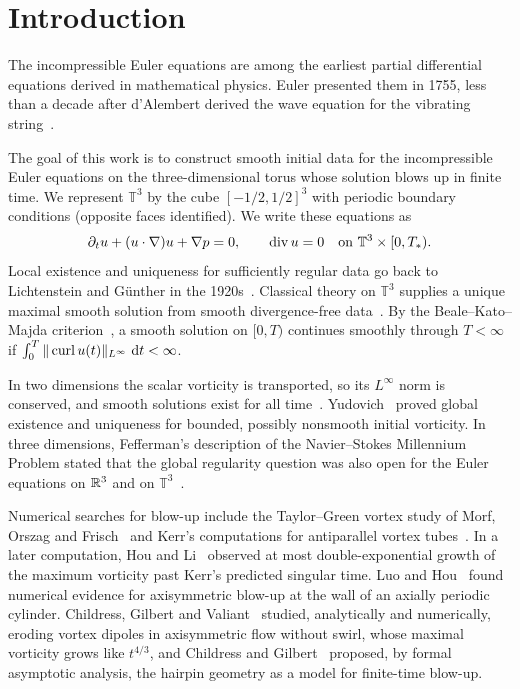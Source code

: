 \section{Introduction}\label{cc:sec:problem}

The incompressible Euler equations are among the earliest partial
differential equations derived in mathematical physics. Euler presented them in
1755, less than a decade after d'Alembert derived the wave equation for
the vibrating string~\cite{DAlembert1747,Euler1757}.

The goal of this work is to construct smooth initial data for the
incompressible Euler equations on the three-dimensional torus whose
solution blows up in finite time. We represent $\mathbb T^3$ by the
cube $[-1/2,1/2]^3$ with periodic boundary conditions
(opposite faces identified). We write these equations as
\begin{equation}\label{cc:eq:euler}
 \partial_tu+(u\cdot\nabla)u+\nabla p=0,
 \qquad \operatorname{div} u=0
 \quad\hbox{on }\mathbb T^3\times[0,T_*).
\end{equation}
Local existence and uniqueness for sufficiently regular data go back to
Lichtenstein and G\"unther in the 1920s~\cite{Lichtenstein1925,Gunther1926}.
Classical theory on $\mathbb T^3$ supplies a unique maximal smooth solution
from smooth divergence-free data~\cite{EbinMarsden,BedrossianVicol}.
By the Beale--Kato--Majda criterion~\cite{BKM,GGPP}, a smooth solution on
$[0,T)$ continues smoothly through $T<\infty$ if
$\int_0^T\|\operatorname{curl} u(t)\|_{L^\infty}\,\,\mathrm d t<\infty$.

In two dimensions the scalar vorticity is transported, so its
$L^\infty$ norm is conserved, and smooth solutions exist for all
time~\cite{Wolibner1933}. Yudovich~\cite{Yudovich1963} proved global
existence and uniqueness for bounded, possibly nonsmooth initial
vorticity. In three dimensions, Fefferman's description of the
Navier--Stokes Millennium Problem stated that the global regularity
question was also open for the Euler equations on $\mathbb R^3$ and on
$\mathbb T^3$~\cite{Fefferman2006}.

Numerical searches for blow-up include the Taylor--Green vortex study
of Morf, Orszag and Frisch~\cite{MorfOrszagFrisch1980} and Kerr's
computations for antiparallel vortex tubes~\cite{Kerr1993}.
In a later computation, Hou and Li~\cite{HouLi2006} observed at most
double-exponential growth of the maximum vorticity past Kerr's predicted
singular time.
Luo and Hou~\cite{LuoHou2014} found numerical evidence for axisymmetric
blow-up at the wall of an axially periodic cylinder.
Childress, Gilbert and Valiant~\cite{ChildressGilbertValiant2016}
studied, analytically and numerically, eroding vortex dipoles in
axisymmetric flow without swirl, whose maximal vorticity grows like
$t^{4/3}$, and Childress and Gilbert~\cite{ChildressGilbert2018}
proposed, by formal asymptotic analysis, the hairpin geometry as a model
for finite-time blow-up.

